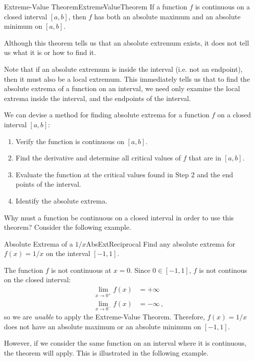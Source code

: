 \begin{theorem}{Extreme-Value Theorem}{ExtremeValueTheorem}
	If a function $f$ is continuous on a closed interval $[a,b]$,
	then $f$ has both an absolute maximum and an absolute minimum on $[a,b]$.
\end{theorem}

Although this theorem tells us that an absolute extremum exists, it
does not tell us what it is or how to find it.

Note that if an absolute extremum is inside the interval (i.e. not
an endpoint), then it must also be a local extremum. This immediately
tells us that to find the absolute extrema of a function on an interval,
we need only examine the local extrema inside the interval, and the
endpoints of the interval.

We can devise a method for finding absolute extrema for a function $f$ on a closed interval $[a,b]$:

\begin{enumerate}
	\item Verify the function is continuous on $[a,b]$.
	\item Find the derivative and determine all critical values of $f$ that are in $[a,b]$.
	\item Evaluate the function at the critical values found in Step 2 and the end points of the interval.
	\item Identify the absolute extrema.
\end{enumerate}

Why must a function be continuous on a closed interval in order to
use this theorem? Consider the following example.

\begin{example}{Absolute Extrema of a $1/x$}{AbsExtReciprocal}
	Find any absolute extrema for $f(x)=1/x$ on the interval $[-1,1]$.
\end{example}
\begin{solution}
	The function $f$ is not continuous at $x=0$. Since $0\in [-1,1]$,
	$f$ is not continous on the closed interval:
	\begin{align*}
		\lim_{x\to 0^+}f(x)&=+\infty	\\
		\lim_{x\to 0^-}f(x)&=-\infty\, ,
	\end{align*}
	so we are \emph{unable} to apply the Extreme-Value Theorem. Therefore,
	$f(x)=1/x$ does not have an absolute maximum or an absolute minimum on $[-1,1]$.
\end{solution}

However, if we consider the same function on an interval where it is
continuous, the theorem will apply. This is illustrated in the following example.

